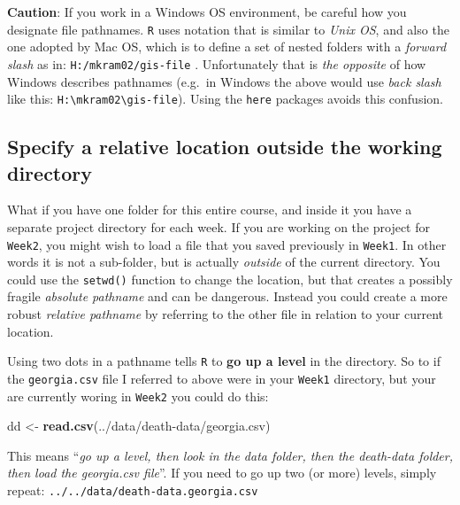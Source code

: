 \documentclass[
]{book}
\newenvironment{Shaded}{\begin{snugshade}}{\end{snugshade}}
\newcommand{\FunctionTok}[1]{\textcolor[rgb]{0.13,0.29,0.53}{\textbf{#1}}}
\newcommand{\NormalTok}[1]{#1}
\newcommand{\OtherTok}[1]{\textcolor[rgb]{0.56,0.35,0.01}{#1}}
\newcommand{\StringTok}[1]{\textcolor[rgb]{0.31,0.60,0.02}{#1}}
\newenvironment{rmdcaution}[1]
  {
  \begin{itemize}
  \renewcommand{\labelitemi}{
    \raisebox{-.7\height}[0pt][0pt]{
      {\setkeys{Gin}{width=3em,keepaspectratio}\texttt{[image: images/\#1]}}
    }
  }
  \setlength{\fboxsep}{1em}
  \begin{caution}
  \item
  }
  {
  \end{caution}
  \end{itemize}
  }
\begin{document}
\begin{rmdcaution}{caution}
\textbf{Caution}: If you work in a Windows OS environment, be careful how you designate file pathnames. \texttt{R} uses notation that is similar to \emph{Unix OS}, and also the one adopted by Mac OS, which is to define a set of nested folders with a \emph{forward slash} as in: \texttt{H:/mkram02/gis-file} . Unfortunately that is \emph{the opposite} of how Windows describes pathnames (e.g.~in Windows the above would use \emph{back slash} like this: \texttt{H:\textbackslash{}mkram02\textbackslash{}gis-file}). Using the \texttt{here} packages avoids this confusion.

\end{rmdcaution}

\hypertarget{specify-a-relative-location-outside-the-working-directory}{%
\subsection{Specify a relative location outside the working directory}\label{specify-a-relative-location-outside-the-working-directory}}

What if you have one folder for this entire course, and inside it you have a separate project directory for each week. If you are working on the project for \texttt{Week2}, you might wish to load a file that you saved previously in \texttt{Week1}. In other words it is not a sub-folder, but is actually \emph{outside} of the current directory. You could use the \texttt{setwd()} function to change the location, but that creates a possibly fragile \emph{absolute pathname} and can be dangerous. Instead you could create a more robust \emph{relative pathname} by referring to the other file in relation to your current location.

Using two dots in a pathname tells \texttt{R} to \textbf{go up a level} in the directory. So to if the \texttt{georgia.csv} file I referred to above were in your \texttt{Week1} directory, but your are currently woring in \texttt{Week2} you could do this:

\begin{Shaded}
\begin{Highlighting}[]
\NormalTok{dd }\OtherTok{\textless{}{-}} \FunctionTok{read.csv}\NormalTok{(}\StringTok{\textquotesingle{}../data/death{-}data/georgia.csv\textquotesingle{}}\NormalTok{)}
\end{Highlighting}
\end{Shaded}

This means ``\emph{go up a level, then look in the data folder, then the death-data folder, then load the georgia.csv file}''. If you need to go up two (or more) levels, simply repeat: \texttt{../../data/death-data.georgia.csv}
\end{document}
